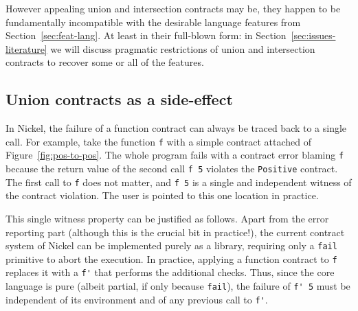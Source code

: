 \documentclass[sigplan,10pt,review,anonymous]{acmart}
\newcommand{\unsure}[2][1=]{}
\newcommand{\nickel}[1]{\lstinline[language=nickel]{#1}}
\begin{document}
However appealing union and intersection contracts may be, they happen
to be fundamentally incompatible with the desirable language
features from Section~\ref{sec:feat-lang}. At least in their
full-blown form: in Section~\ref{sec:issues-literature} we will
discuss pragmatic restrictions of union and intersection contracts to
recover some or all of the features.

\subsection{Union contracts as a side-effect}

In \unsure{Maybe specify its Nickel without Union or inter}Nickel,
the failure of a function contract can always be traced back to a
single call. For example, take the function \nickel{f} with a simple contract
attached of Figure~\ref{fig:pos-to-pos}. The whole program fails with a contract
error blaming \nickel{f} because the return value of the second call \nickel{f 5}
violates the \nickel{Positive} contract. The first call to \nickel{f} does
not matter, and \nickel{f 5} is a single and independent witness of the contract
violation. The user is pointed to this one location in practice.

This single witness property can be justified as follows. Apart from the error
reporting part (although this is the crucial bit in practice!), the current
contract system of Nickel can be implemented purely as a library, requiring only
a \nickel{fail} primitive to abort the execution. In practice, applying a
function contract to \nickel{f} replaces it with a \nickel{f'} that performs the
additional checks. Thus, since the core language is pure (albeit
partial, if only because \nickel{fail}), the failure of \nickel{f' 5}
must be independent of its environment and of any previous call to \nickel{f'}.

%
\end{document}
